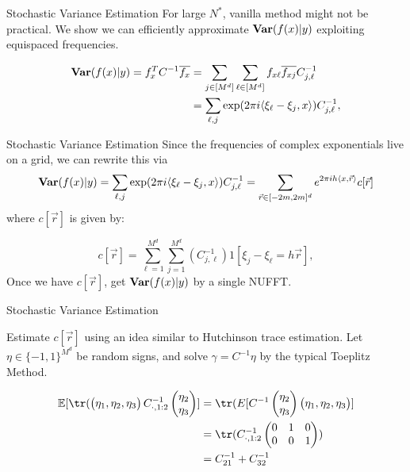 \documentclass[aspectratio=169,xcolor=dvipsnames]{beamer}
\newcommand{\Var}{\text{\textbf{Var}}}
\newcommand{\E}{\mathbb E}
\begin{document}
\begin{frame}{Stochastic Variance Estimation}
For large $N^*$, vanilla method might not be practical. We show we can efficiently approximate $\Var(f(x)|y)$ exploiting equispaced frequencies. 
    
    \begin{align}
\Var(f(x) |y)= f_x^T C^{-1} \overline{f_x} &= \sum_{j\in [M^d]} \sum_{\ell \in [M^d]}  f_{x\ell} \overline{f_{xj}} C_{j,\ell}^{-1}\\
& = \sum_{\ell, j} \exp(2\pi i \langle \xi_\ell - \xi_j,x\rangle) C_{j,\ell}^{-1},
\end{align}
\end{frame}

\begin{frame}{Stochastic Variance Estimation}
    Since the frequencies of complex exponentials live on a grid, we can 
rewrite this via
\begin{align}
\Var(f(x)|y) = \sum_{\ell, j} \exp(2\pi i \langle \xi_\ell - \xi_j,x\rangle) C_{j,\ell}^{-1}=\sum_{\vec{r} \in [-2m, 2m]^d} e^{2\pi ih \langle{x},{\vec{r} }\rangle } c[\vec{r}] \label{nufft_var}
\end{align}
where $c[\vec{r}]$ is given by:

$$c[\vec{r}] = \sum_{\ell = 1}^{M^d} \sum_{j=1}^{M^d} (C_{j,\ell}^{-1} )1[\xi_j - \xi_\ell = h\vec{r}],$$
   Once we have $c[\vec{r}]$, get $\Var(f(x)|y)$ by a single NUFFT. 

\end{frame}
\begin{frame}{Stochastic Variance Estimation}
 
    
    Estimate $c[\vec{r}]$ using an idea similar to Hutchinson trace estimation. Let $\eta \in \{-1,1\}^{M^d}$ be random signs, and solve $\gamma = C^{-1} \eta$ by the typical Toeplitz Method. 
    
    \begin{align}
   \E[\tr(\begin{pmatrix}
    \eta_1, \eta_2 , \eta_3 
\end{pmatrix} C^{-1}_{\cdot , 1:2} \begin{pmatrix}
    \eta_2\\
    \eta_3\\
\end{pmatrix}] &= \tr(E[C^{-1} \begin{pmatrix}
    \eta_2\\
    \eta_3\\
\end{pmatrix}\begin{pmatrix}
    \eta_1, \eta_2 , \eta_3 
\end{pmatrix} ] \\
&= \tr(C^{-1}_{\cdot , 1:2}  \begin{pmatrix}
    0&1&0\\
    0&0&1
\end{pmatrix})\\
& = C^{-1}_{21} + C^{-1}_{32} 
\end{align}
\end{frame}
\end{document}
